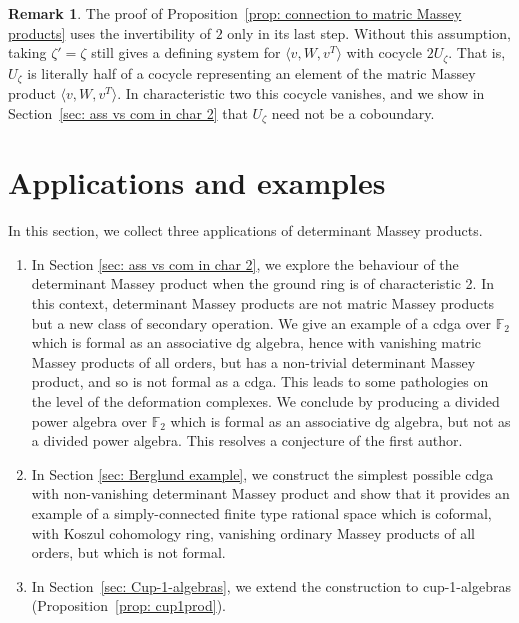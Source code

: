 \documentclass[11pt]{article}
\theoremstyle{definition}
\theoremstyle{definition}
\newtheorem{remark}[theorem]{Remark}
\begin{document}
\begin{remark} \label{rmk: halving}
The proof of Proposition~\ref{prop: connection to matric Massey products}
uses the invertibility of $2$ only in its last step.
Without this assumption, taking $\zeta' = \zeta$ still gives a defining system for $\langle v,W,v^T\rangle$
with cocycle $2U_\zeta$. 
That is, $U_\zeta$ is literally half of a cocycle representing an element of the matric Massey product $\langle v, W, v^T \rangle$.
In characteristic two this cocycle vanishes, and we show in Section~\ref{sec: ass vs com in char 2}
that $U_\zeta$ need not be a coboundary.
\end{remark}




\section{Applications and examples}
\label{sec: applications}


In this section, we collect three applications of determinant Massey products.

\begin{enumerate}
    \item In Section \ref{sec: ass vs com in char 2}, we explore the behaviour of the determinant Massey product when the ground ring is of characteristic 2.
In this context, determinant Massey products are not matric Massey products 
but a new class of secondary operation.
We give an example of a cdga over $\mathbb F_2$ which is formal as an associative dg algebra, hence with vanishing matric Massey products of all orders, but has a non-trivial determinant Massey product, and so is not formal as a cdga. 
This leads to some pathologies on the level of the deformation complexes.
We conclude by producing a divided power algebra over $\mathbb F_2$ which is formal as an associative dg algebra, but not as a divided power algebra.
This resolves a conjecture of the first author.

\item In Section \ref{sec: Berglund example}, we construct the simplest possible cdga with non-vanishing determinant Massey product and show that it provides an example of a simply-connected finite type rational space which is coformal, with Koszul cohomology ring, vanishing ordinary Massey products of all orders, but which is not formal. 

\item In Section~\ref{sec: Cup-1-algebras},
we extend the construction to cup-1-algebras (Proposition~\ref{prop: cup1prod}). 

\end{enumerate}
\end{document}
